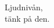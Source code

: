 \documentclass[a4paper,12pt]{article}
\begin{document}
\linespread{2}
\centering

\mbox{}
\vspace{4.5cm}

\fontsize{110}{40}\selectfont
\normalfont
Ljudnivån,\\
tänk på den.
\end{document}
